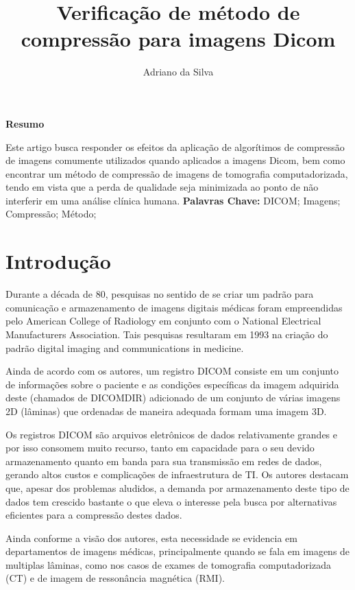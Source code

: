 \documentclass{IEEEtran}
\title{Verificação de método de compressão para imagens Dicom}
\author{Adriano da Silva}
\begin{document}
    
    
    \maketitle
    
    

    
    \textbf{Resumo}

    Este artigo busca responder os efeitos da aplicação de algorítimos de
compressão de imagens comumente utilizados quando aplicados a imagens
Dicom, bem como encontrar um método de compressão de imagens de
tomografia computadorizada, tendo em vista que a perda de qualidade seja
minimizada ao ponto de não interferir em uma análise clínica humana.
\textbf{Palavras Chave:} DICOM; Imagens; Compressão; Método;

    \section{Introdução}\label{introduuxe7uxe3o}

    Durante a década de 80, pesquisas no sentido de se criar um padrão para
comunicação e armazenamento de imagens digitais médicas foram
empreendidas pelo American College of Radiology em conjunto com o
National Electrical Manufacturers Association. Tais pesquisas resultaram
em 1993 na criação do padrão digital imaging and communications in
medicine. \cite{grauer2009working}

Ainda de acordo com os autores, um registro DICOM consiste em um
conjunto de informações sobre o paciente e as condições específicas da
imagem adquirida deste (chamados de DICOMDIR) adicionado de um conjunto
de várias imagens 2D (lâminas) que ordenadas de maneira adequada formam
uma imagem 3D.

Os registros DICOM são arquivos eletrônicos de dados relativamente
grandes e por isso consomem muito recurso, tanto em capacidade para o
seu devido armazenamento quanto em banda para sua transmissão em redes
de dados, gerando altos custos e complicações de infraestrutura de
TI.\cite{koff2009pan} Os autores destacam que, apesar dos problemas
aludidos, a demanda por armazenamento deste tipo de dados tem crescido
bastante o que eleva o interesse pela busca por alternativas eficientes
para a compressão destes dados.

Ainda conforme a visão dos autores, esta necessidade se evidencia em
departamentos de imagens médicas, principalmente quando se fala em
imagens de multiplas lâminas, como nos casos de exames de tomografia
computadorizada (CT) e de imagem de ressonância magnética (RMI).
\end{document}
